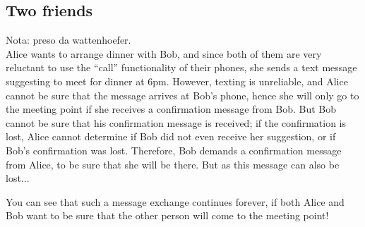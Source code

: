 \bigskip
\subsection{Two friends}
Nota: preso da wattenhoefer.\\
Alice wants to arrange dinner with Bob, and since both of them are very reluctant to use the \enquote{call} functionality of their phones, she sends a text message suggesting to meet for dinner at 6pm. However, texting is unreliable, and Alice cannot be sure that the message arrives at Bob's phone, hence she will only go to the meeting point if she receives a confirmation message from Bob. But Bob cannot be sure that his confirmation message is received; if the confirmation is lost, Alice cannot determine if Bob did not even receive her suggestion, or if Bob's confirmation was lost. Therefore, Bob demands a confirmation message from Alice, to be sure that she will be there. But as this message can also be lost...

\bigskip
\noindent
You can see that such a message exchange continues forever, if both Alice and Bob want to be sure that the other person will come to the meeting point!

\bigskip
